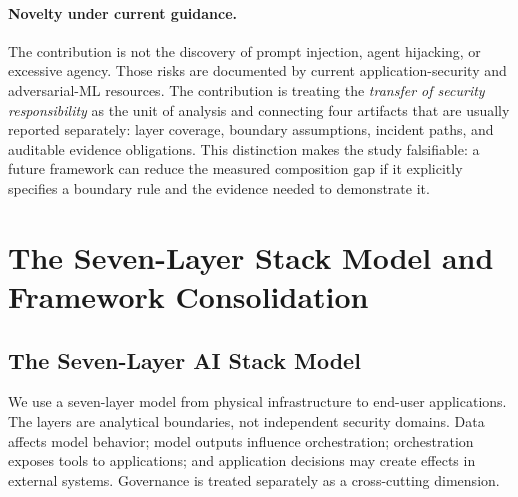 \documentclass[runningheads]{llncs}
\begin{document}
\paragraph{Novelty under current guidance.} The contribution is not the discovery of prompt injection, agent hijacking, or excessive agency. Those risks are documented by current application-security and adversarial-ML resources. The contribution is treating the \emph{transfer of security responsibility} as the unit of analysis and connecting four artifacts that are usually reported separately: layer coverage, boundary assumptions, incident paths, and auditable evidence obligations. This distinction makes the study falsifiable: a future framework can reduce the measured composition gap if it explicitly specifies a boundary rule and the evidence needed to demonstrate it.

\section{The Seven-Layer Stack Model and Framework Consolidation}
\label{sec:model}

\subsection{The Seven-Layer AI Stack Model}

We use a seven-layer model from physical infrastructure to end-user applications. The layers are analytical boundaries, not independent security domains. Data affects model behavior; model outputs influence orchestration; orchestration exposes tools to applications; and application decisions may create effects in external systems. Governance is treated separately as a cross-cutting dimension.
\end{document}
